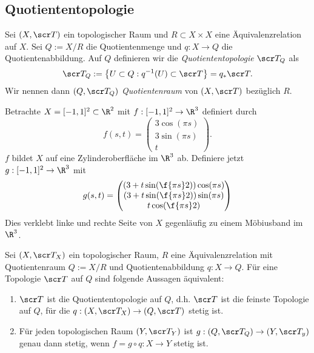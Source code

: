 \subsection{Quotiententopologie}

\begin{df}
	Sei $(X, \scr T)$ ein topologischer Raum und $R \subset X \times X$ eine Äquivalenzrelation auf $X$.
	Sei $Q := X / R$ die Quotientenmenge und $q: X \to Q$ die Quotientenabbildung.
	Auf $Q$ definieren wir die \emph{Quotiententopologie} $\scr T_Q$ als
	\[
		\scr T_Q
		:= \big\{ U \subset Q : q^{-1}(U) \subset \scr T \big\}
		= q_* \scr T.
	\]
	Wir nennen dann $(Q, \scr T_Q)$ \emph{Quotientenraum} von $(X, \scr T)$ bezüglich $R$.
\end{df}

\begin{ex}
	Betrachte $X = [-1,1]^2 \subset \R^2$ mit $f: [-1,1]^2 \to \R^3$ definiert durch
	\[
		f(s, t) = \begin{pmatrix}
			3 \cos(\pi s) \\
			3 \sin(\pi s) \\
			t
		\end{pmatrix}.
	\]
	$f$ bildet $X$ auf eine Zylinderoberfläche im $\R^3$ ab.
	Definiere jetzt $g: [-1,1]^2 \to \R^3$ mit
	\[
		g(s, t) = \begin{pmatrix}
			(3 + t \sin(\f{\pi s}2)) \cos (\pi s) \\
			(3 + t \sin(\f{\pi s}2)) \sin (\pi s) \\
			t \cos(\f {\pi s}2)
		\end{pmatrix}
	\]
	Dies verklebt linke und rechte Seite von $X$ gegenläufig zu einem Möbiusband im $\R^3$.
\end{ex}

\begin{st}
	Sei $(X, \scr T_X)$ ein topologischer Raum, $R$ eine Äquivalenzrelation mit Quotientenraum $Q := X / R$ und Quotientenabbildung $q: X \to Q$.
	Für eine Topologie $\scr T$ auf $Q$ sind folgende Aussagen äquivalent:
	\begin{enumerate}[(1)]
		\item
			$\scr T$ ist die Quotiententopologie auf $Q$, d.h. $\scr T$ ist die feinste Topologie auf $Q$, für die $q: (X, \scr T_X) \to (Q, \scr T)$ stetig ist.
		\item
			Für jeden topologischen Raum $(Y, \scr T_Y)$ ist $g: (Q, \scr T_Q) \to (Y, \scr T_y)$ genau dann stetig, wenn $f = g \circ q: X \to Y$ stetig ist.
	\end{enumerate}
\end{st}

